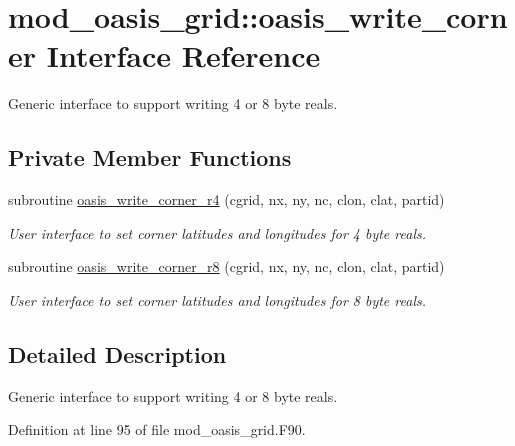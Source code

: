 \hypertarget{interfacemod__oasis__grid_1_1oasis__write__corner}{\section{mod\+\_\+oasis\+\_\+grid\+:\+:oasis\+\_\+write\+\_\+corner Interface Reference}
\label{interfacemod__oasis__grid_1_1oasis__write__corner}
}


Generic interface to support writing 4 or 8 byte reals.  


\subsection*{Private Member Functions}
\begin{DoxyCompactItemize}
\item 
subroutine \hyperlink{interfacemod__oasis__grid_1_1oasis__write__corner_acb0520c68b0c2c954efc30818d2fc35e}{oasis\+\_\+write\+\_\+corner\+\_\+r4} (cgrid, nx, ny, nc, clon, clat, partid)
\begin{DoxyCompactList}\small\item\em User interface to set corner latitudes and longitudes for 4 byte reals. \end{DoxyCompactList}\item 
subroutine \hyperlink{interfacemod__oasis__grid_1_1oasis__write__corner_a441287a06e48050d2891f65497b756a0}{oasis\+\_\+write\+\_\+corner\+\_\+r8} (cgrid, nx, ny, nc, clon, clat, partid)
\begin{DoxyCompactList}\small\item\em User interface to set corner latitudes and longitudes for 8 byte reals. \end{DoxyCompactList}\end{DoxyCompactItemize}


\subsection{Detailed Description}
Generic interface to support writing 4 or 8 byte reals. 

Definition at line 95 of file mod\+\_\+oasis\+\_\+grid.\+F90.




